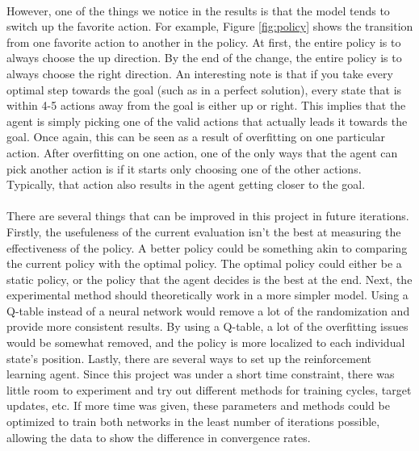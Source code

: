 \documentclass[12pt]{article}
\begin{document}
\paragraph{}
However, one of the things we notice in the results is that the model tends to switch up the favorite action.
For example, Figure \ref{fig:policy} shows the transition from one favorite action to another in the policy.
At first, the entire policy is to always choose the up direction.
By the end of the change, the entire policy is to always choose the right direction.
An interesting note is that if you take every optimal step towards the goal (such as in a perfect solution), every state that is within 4-5 actions away from the goal is either up or right.
This implies that the agent is simply picking one of the valid actions that actually leads it towards the goal.
Once again, this can be seen as a result of overfitting on one particular action.
After overfitting on one action, one of the only ways that the agent can pick another action is if it starts only choosing one of the other actions.
Typically, that action also results in the agent getting closer to the goal.

\paragraph{}
There are several things that can be improved in this project in future iterations.
Firstly, the usefuleness of the current evaluation isn't the best at measuring the effectiveness of the policy.
A better policy could be something akin to comparing the current policy with the optimal policy.
The optimal policy could either be a static policy, or the policy that the agent decides is the best at the end.
Next, the experimental method should theoretically work in a more simpler model.
Using a Q-table instead of a neural network would remove a lot of the randomization and provide more consistent results.
By using a Q-table, a lot of the overfitting issues would be somewhat removed, and the policy is more localized to each individual state's position.
Lastly, there are several ways to set up the reinforcement learning agent.
Since this project was under a short time constraint, there was little room to experiment and try out different methods for training cycles, target updates, etc.
If more time was given, these parameters and methods could be optimized to train both networks in the least number of iterations possible, allowing the data to show the difference in convergence rates.
\end{document}
